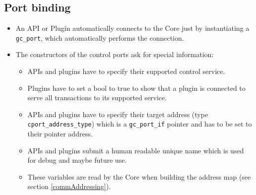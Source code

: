 \subsection{Port binding}
\label{commPortBinding}
\begin{itemize}

	
	
	\item An API or Plugin automatically connects to the Core just by instantiating a \lstinline|gc_port|, which automatically performs the connection.
	
	\item The constructors of the control ports ask for special information: 
	\begin{itemize}
		\item APIs and plugins have to specify their supported control service. 
		\item Plugins have to set a bool to true to show that a plugin is connected to serve all transactions to its supported service. 
		\item APIs and plugins have to specify their target address (type \lstinline|cport_address_type|) which is a \lstinline|gc_port_if| pointer and has to be set to their pointer address. 
		\item APIs and plugins submit a human readable unique name which is used for debug and maybe future use. 
		\item These variables are read by the Core when building the address map (see section \ref{commAddressing}). 
	\end{itemize}

\end{itemize}


